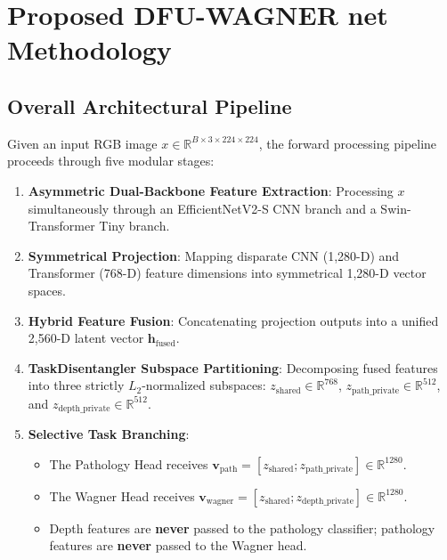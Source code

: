 \documentclass[journal]{IEEEtran}
\begin{document}
\section{Proposed DFU-WAGNER net Methodology}

\subsection{Overall Architectural Pipeline}
Given an input RGB image $x \in \mathbb{R}^{B \times 3 \times 224 \times 224}$, the forward processing pipeline proceeds through five modular stages:
\begin{enumerate}
    \item \textbf{Asymmetric Dual-Backbone Feature Extraction}: Processing $x$ simultaneously through an EfficientNetV2-S CNN branch and a Swin-Transformer Tiny branch.
    \item \textbf{Symmetrical Projection}: Mapping disparate CNN (1,280-D) and Transformer (768-D) feature dimensions into symmetrical 1,280-D vector spaces.
    \item \textbf{Hybrid Feature Fusion}: Concatenating projection outputs into a unified 2,560-D latent vector $\mathbf{h}_{\text{fused}}$.
    \item \textbf{TaskDisentangler Subspace Partitioning}: Decomposing fused features into three strictly $L_2$-normalized subspaces: $z_{\text{shared}} \in \mathbb{R}^{768}$, $z_{\text{path\_private}} \in \mathbb{R}^{512}$, and $z_{\text{depth\_private}} \in \mathbb{R}^{512}$.
    \item \textbf{Selective Task Branching}:
    \begin{itemize}
        \item The Pathology Head receives $\mathbf{v}_{\text{path}} = [z_{\text{shared}}; z_{\text{path\_private}}] \in \mathbb{R}^{1280}$.
        \item The Wagner Head receives $\mathbf{v}_{\text{wagner}} = [z_{\text{shared}}; z_{\text{depth\_private}}] \in \mathbb{R}^{1280}$.
        \item Depth features are \textbf{never} passed to the pathology classifier; pathology features are \textbf{never} passed to the Wagner head.
    \end{itemize}
\end{enumerate}
\end{document}
